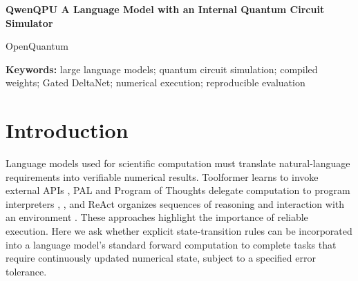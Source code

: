 \documentclass[11pt,a4paper]{article}
\begin{document}
\begin{center}
{\LARGE\bfseries QwenQPU A Language Model with an Internal Quantum Circuit Simulator\par}
\vspace{12pt}
{\large OpenQuantum\par}
\vspace{8pt}
\end{center}
\begin{abstract}
We present QwenQPU, a language model with a quantum-circuit simulator implemented within its standard layers. The model combines 32 language layers inherited from Qwen3.5-4B with four analytically constructed, fixed-weight layers. The language layers produce structured requests; the execution layers maintain addressable complex amplitudes in recurrent state, compose quantum gates through shared SwiGLU arithmetic, and correct probability readout under a specified norm condition. The added operators require no further training and run through the standard Transformers forward pass. We evaluate 48 frozen, paired tasks spanning 3, 4, and 6 logical qubits and 12, 18, and 24 sequential gates. Both conditions share language weights and a budget ceiling of 16,384 generated predictions, including every QPU forward prediction. Enabling execution increases the number of tasks satisfying an absolute error threshold of 5\ensuremath{\times}10\textsuperscript{-5} for both requested event probabilities from 4/48 to 48/48. The maximum probability error is 1.42\ensuremath{\times}10\textsuperscript{-5}, with a two-sided exact McNemar p-value of 1.14\ensuremath{\times}10\textsuperscript{-13}. Under the fixed six-qubit, two-event protocol, QPU predictions follow \(N_{\mathrm{QPU}}=2{,}063+514G\), where G is the gate count; improved task success comes with more total predictions and longer runtime. These results demonstrate an executable and verifiable integration of explicit numerical rules with pretrained language capabilities, with accuracy and cost characterized within a finite-capacity, finite-precision setting.
\end{abstract}
\textbf{Keywords:} large language models; quantum circuit simulation; compiled weights; Gated DeltaNet; numerical execution; reproducible evaluation

\section{Introduction}

Language models used for scientific computation must translate natural-language requirements into verifiable numerical results. Toolformer learns to invoke external APIs \cite{ref1}, PAL and Program of Thoughts delegate computation to program interpreters \cite{ref2}, \cite{ref3}, and ReAct organizes sequences of reasoning and interaction with an environment \cite{ref4}. These approaches highlight the importance of reliable execution. Here we ask whether explicit state-transition rules can be incorporated into a language model's standard forward computation to complete tasks that require continuously updated numerical state, subject to a specified error tolerance.
\end{document}

